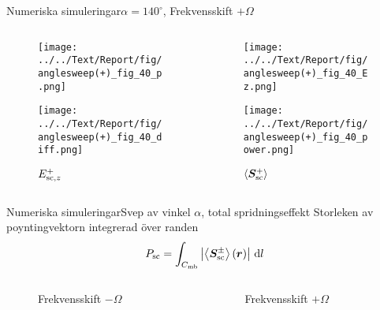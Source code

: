\documentclass[11pt, final]{beamer}
\begin{document}
	\begin{frame}{Numeriska simuleringar}{$\alpha = 140^\circ$, Frekvensskift $+\Omega$}
		\begin{columns}
			\begin{column}{0.5\textwidth}
				\begin{figure}
					\centering
					\begin{overprint}
						\texttt{[image: ../../Text/Report/fig/anglesweep(+)\_fig\_40\_p.png]}
						\caption*{$p$}
						
						\texttt{[image: ../../Text/Report/fig/anglesweep(+)\_fig\_40\_diff.png]}
						\caption*{$E_{\mathrm{sc}, z}^+$}
					\end{overprint}
				\end{figure}
			\end{column}
			\begin{column}{0.5\textwidth}
				\begin{figure}
					\centering
					\begin{overprint}
						\onslide<1>
						\texttt{[image: ../../Text/Report/fig/anglesweep(+)\_fig\_40\_Ez.png]}
						\caption*{$E_{\mrm{i}, z}$}
						
						\onslide<2>
						\texttt{[image: ../../Text/Report/fig/anglesweep(+)\_fig\_40\_power.png]}
						\caption*{$\left< \bm{S}_{\mathrm{sc}}^+ \right>$}
					\end{overprint}
				\end{figure}
			\end{column}
		\end{columns}
	\end{frame}
	
	\begin{frame}{Numeriska simuleringar}{Svep av vinkel $\alpha$, total spridningseffekt}
		Storleken av poyntingvektorn integrerad över randen
		\begin{equation*}
		P_{\mathrm{sc}} = \int_{C_{\mathrm{mb}}} \left| \left< \bm{S}_{\mathrm{sc}}^\pm \right> (\bm{r}) \right|  \, \mathrm{d}l
		\end{equation*}
		\pause
		\begin{columns}
			\begin{column}{0.5\textwidth}
				\begin{figure}
					\centering
					\resizebox{\textwidth}{!}{}
					\caption*{Frekvensskift $-\Omega$}
				\end{figure}
			\end{column}
			\begin{column}{0.5\textwidth}
				\begin{figure}
					\centering
					\resizebox{\textwidth}{!}{}
					\caption*{Frekvensskift $+ \Omega$}
				\end{figure}
			\end{column}
		\end{columns}
	\end{frame}
		
\end{document}
